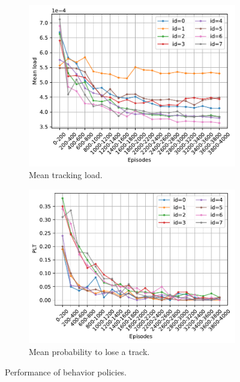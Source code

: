 \documentclass[english, 12pt, a4paper, elec, utf8, a-1b, online]{aaltothesis}
\begin{document}
\begin{figure}
    \centering
    \begin{subfigure}[b]{0.8\textwidth}
        \includegraphics[width=\textwidth]{figures/benchmark/Training/online_load.pdf}
        \caption{Mean tracking load.}
        \label{fig:online_load}
    \end{subfigure}
    \hfill
    \begin{subfigure}[b]{0.8\textwidth}
        \includegraphics[width=\textwidth]{figures/benchmark/Training/online_plt.pdf}
        \caption{Mean probability to lose a track.}
        \label{fig:online_lost}
    \end{subfigure}
    \caption{Performance of behavior policies.}
    \label{fig:online_performance}
\end{figure}
\end{document}

